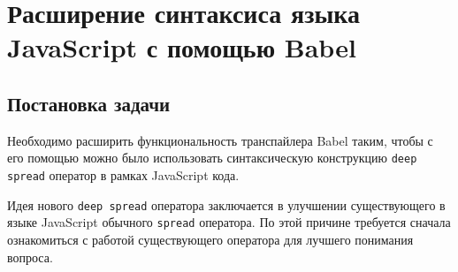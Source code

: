 \documentclass[14pt, a4paper]{article}
\def\code#1{\texttt{#1}} %
\begin{document}
% 
 

\pagebreak

\section{Расширение синтаксиса языка JavaScript с помощью Babel}
\subsection{Постановка задачи}
Необходимо расширить функциональность транспайлера Babel таким, чтобы с его помощью можно было использовать 
синтаксическую конструкцию \code{deep spread} оператор в рамках JavaScript кода. 

Идея нового \code{deep spread} оператора заключается в улучшении существующего в языке JavaScript обычного \code{spread}
оператора. По этой причине требуется сначала ознакомиться с работой существующего оператора для лучшего понимания вопроса.
\end{document}
